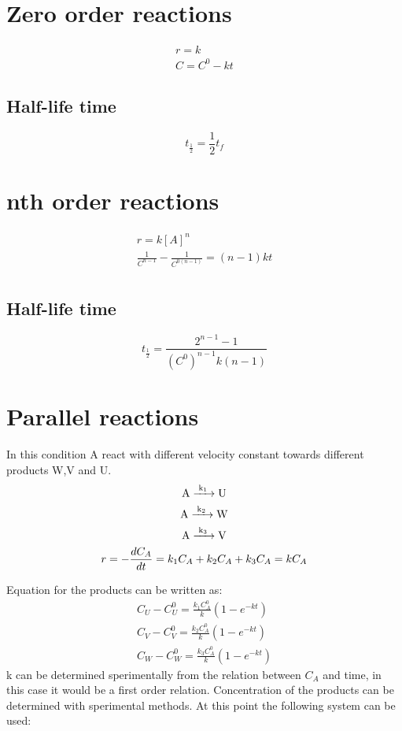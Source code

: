 \documentclass[../Master.tex]{subfiles}
\begin{document}
\begin{multicols*}{2}
	\section{Zero order reactions}
	\begin{gather*}
		r = k\\
		C = C^0 - kt
	\end{gather*}
	\subsection{Half-life time}
	\[
		t_{\frac{1}{2}}  = \frac{1}{2}t_{f}
	\]
	\section{nth order reactions}
	\begin{gather*}
		r = k[A]^{n} \\
		\frac{1}{C^{n-1} } - \frac{1}{C^{0(n-1 )} } = (n-1)kt\\
	\end{gather*}
	\subsection{Half-life time}
	\[
		t_{\frac{1}{2}} = \frac{2^{n-1} -1 }{(C^{0} )^{n-1} k(n-1)}
	\]

	\section{Parallel reactions}
	In this condition A react with different velocity constant towards different
	products W,V and U.
	\begin{gather*}
		\ce{ A ->[{k_{1}}] U} \\
		\ce{ A ->[{k_{2}}] W} \\
		\ce{ A ->[{k_{3}}] V} \\
		r =  - \frac{dC_{A} }{dt} = k_{1}C_{A} + k_{2}C_{A} + k_{3}C_{A} = kC_{A}
	\end{gather*}

	Equation for the products can be written as:
	\begin{gather*}
		C_{U} - C_{U}^{0} = \frac{k_{1}C_{A}^{0}}{k}(1-e^{-kt})\\
		C_{V} - C_{V}^{0} = \frac{k_{2}C_{A}^{0}}{k}(1-e^{-kt})\\
		C_{W} - C_{W}^{0} = \frac{k_{3}C_{A}^{0}}{k}(1-e^{-kt})
	\end{gather*}
	k can be determined sperimentally from the relation between \( C_{A}  \) and time, in this case it would be a first order relation.
	Concentration of the products can be determined with sperimental methods. At this point the following system can be used:


\end{multicols*}
\end{document}
